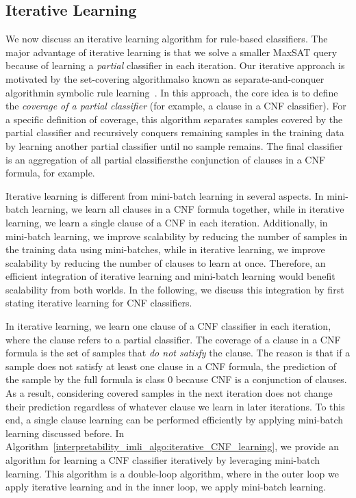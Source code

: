 \subsection{Iterative Learning}  We now discuss an iterative learning algorithm for rule-based classifiers.  The major advantage of iterative learning is that we solve a smaller MaxSAT query because of learning a \textit{partial} classifier in each iteration. Our iterative approach is motivated by the set-covering algorithm\textemdash also known as separate-and-conquer algorithm\textemdash in symbolic rule learning~\cite{furnkranz1999separate}. In this approach, the core idea is to define the \emph{coverage of a partial classifier} (for example, a clause in a CNF classifier). For a specific definition of coverage, this  algorithm separates samples covered by the partial classifier and recursively conquers remaining samples in the training data by learning another partial classifier until no sample remains. The final classifier is an aggregation of all partial classifiers\textemdash the conjunction of clauses in a CNF formula, for example. 

Iterative learning is different from mini-batch learning in several aspects. In mini-batch learning, we learn all clauses in a CNF formula together, while in iterative learning, we learn a single clause of a CNF in each iteration. Additionally, in mini-batch learning, we improve scalability by reducing the number of samples in the training data using mini-batches, while in iterative learning, we improve scalability by reducing the number of clauses to learn at once. Therefore, an efficient integration of iterative learning and mini-batch learning would benefit scalability from both worlds. In the following, we discuss this integration by first stating iterative learning for CNF classifiers.


In iterative learning, we learn one clause of a CNF classifier in each iteration, where the clause refers to a partial classifier. The coverage of a clause in a CNF formula is the set of samples that \emph{do not satisfy} the clause. The reason is that if a sample does not satisfy at least one clause in a CNF formula, the prediction of the sample by the full formula is class $ 0 $ because CNF is a conjunction of clauses. As a result, considering covered samples in the next iteration does not change their prediction regardless of whatever clause we learn in later iterations. To this end, a single clause learning can be performed efficiently by applying mini-batch learning discussed before. In Algorithm~\ref{interpretability_imli_algo:iterative_CNF_learning}, we provide an algorithm for learning a CNF classifier iteratively by leveraging mini-batch learning. This algorithm is a double-loop algorithm, where in the outer loop we apply iterative learning and in the inner loop, we apply mini-batch learning.



